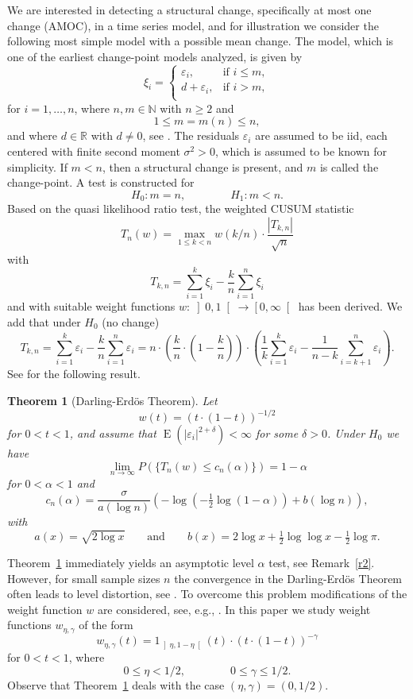 \documentclass[a4paper]{amsart}
\theoremstyle{definition}
\theoremstyle{plain}
\newtheorem{thm}[exmp]{Theorem}
\newcommand{\N}{\mathbb N}
\newcommand{\R}{\mathbb R}
\newcommand{\e}{\varepsilon}
\newcommand{\E}{\operatorname{E}}
\newcommand{\cp}{m}
\begin{document}
We are interested in detecting a structural change, specifically at most
one change (AMOC), in a time series model, and for illustration we
consider the following most simple model with a possible mean change. The
model, which is one of the earliest change-point models analyzed,
is given by
\[
\xi_i =
\begin{cases}
\e_i, &\text{if $i\le \cp$},\\
d +\e_i, &\text{if $i> \cp$},\\
\end{cases}
\]
for $i=1,\dots,n$, where $n,m \in \N$ with $n \geq 2$ and
\[
1 \leq \cp = \cp(n) \le n,
\]
and where $d \in \R$ with $d \neq 0$,
see \citet*{Page57}.
The residuals $\e_i$ are assumed to be iid, each
centered with finite second moment $\sigma^2 > 0$, which is assumed
to be known for simplicity. If $m < n$, then a structural
change is present, and $m$ is called the change-point.
A test is constructed for
\[
H_0\colon m=n, \qquad\qquad H_1\colon m<n.
\]
Based on the quasi likelihood ratio test,
the weighted CUSUM statistic
\[
T_n(w) = \max_{1\le k<n}
w(k/n) \cdot \frac{|T_{k,n}|}{\sqrt{n}}
\]
with
\[
T_{k,n} = \sum^k_{i=1}\xi_i-\frac{k}{n}\sum^n_{i=1}\xi_i
\]
and with suitable weight functions $w : \left]0,1\right[ \to
\left[0,\infty\right[$ has been derived. We add that under $H_0$
(no change)
\[
T_{k,n} =
\sum^k_{i=1}\e_i-\frac{k}{n}\sum^n_{i=1}\e_i =
n \cdot \left(\frac{k}{n} \cdot \left(1-\frac{k}{n}\right)\right) \cdot
\left( \frac{1}{k} \sum_{i=1}^k \e_i - \frac{1}{n-k}
\sum_{i=k+1}^n \e_i \right).
\]
See \citet*[Thm.~2.1.2]{book:CsorgoHorvath} for the
following result.

\begin{thm}[Darling-Erd\"os Theorem]\label{t1}
Let
\[
w(t) = (t \cdot (1-t))^{-1/2}
\]
for $0 < t < 1$, and assume that $\E(|\e_i|^{2+\delta}) < \infty$
for some $\delta > 0$. Under $H_0$ we have
\[
\lim_{n \to \infty} P(\{ T_n(w) \leq c_{n}(\alpha)\}) =
1-\alpha
\]
for $0 < \alpha < 1$ and
\[
c_{n}(\alpha) =
\frac{\sigma}{a(\log n)}
\left(-\log \left(-\tfrac{1}{2} \log(1-\alpha)\right)+
b(\log n)\right) ,
\]
with
\[
a(x)=\sqrt{2\log x}
\qquad\text{and}\qquad
b(x)=2\log x +\tfrac{1}{2}\log \log x - \tfrac{1}{2}\log
\pi.
\]
\end{thm}

Theorem~\ref{t1} immediately yields an asymptotic level $\alpha$
test, see Remark~\ref{r2}. However, for small sample sizes
$n$ the convergence in the Darling-Erd\"os
Theorem often leads to level distortion,
see \cite{dissertationKirch}.
To overcome this problem
modifications of the weight function $w$ are considered,
see, e.g., \citet*{CsorgoHorvath88}.
In this paper we study weight functions $w_{\eta,\gamma}$ of the form
\begin{equation}\label{eq:weightfunction}
w_{\eta,\gamma}(t) = 1_{\left]\eta,1-\eta\right[}(t)
\cdot (t \cdot (1-t))^{-\gamma}
\end{equation}
for $0 < t < 1$, where
\[
0 \leq \eta < 1/2, \qquad\qquad 0 \leq \gamma \leq 1/2.
\]
Observe that Theorem~\ref{t1} deals with the case $(\eta,\gamma)=(0,1/2)$.
\end{document}
